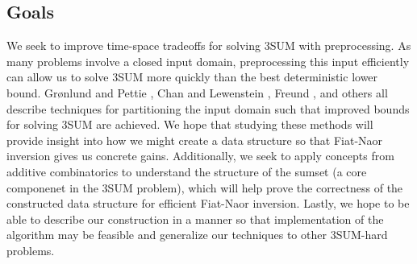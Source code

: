 \documentclass[12pt]{article}
\begin{document}
\subsection*{Goals}
We seek to improve time-space tradeoffs for solving 3SUM with preprocessing. As many problems involve a closed input domain, preprocessing this input efficiently can allow us to solve 3SUM more quickly than the best deterministic lower bound. Grønlund and Pettie \cite{gronlund2014threesomes}, Chan and Lewenstein \cite{chan2015clustered}, Freund \cite{freund2017improved}, and others all describe techniques for partitioning the input domain such that improved bounds for solving 3SUM are achieved. We hope that studying these methods will provide insight into how we might create a data structure so that Fiat-Naor inversion gives us concrete gains. Additionally, we seek to apply concepts from additive combinatorics to understand the structure of the sumset (a core componenet in the 3SUM problem), which will help prove the correctness of the constructed data structure for efficient Fiat-Naor inversion. Lastly, we hope to be able to describe our construction in a manner so that implementation of the algorithm may be feasible and generalize our techniques to other 3SUM-hard problems.

\newpage





\end{document}
